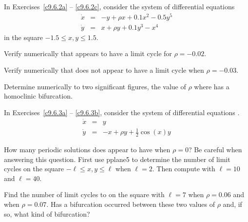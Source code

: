 \documentclass{ximera}
\begin{document}
\noindent In Exercises~\ref{c9.6.2a} -- \ref{c9.6.2c}, consider the system 
of differential equations 
\begin{equation*}  \label{E:homo2}
\begin{array}{rcl}
\dot{x} & = & -y + \rho x + 0.1 x^2 - 0.5 y^5 \\
\dot{y} & = & x +\rho y + 0.1 y^3 - x^4
\end{array}
\end{equation*}
in the square $-1.5\leq x,y\leq 1.5$.
\begin{exercise} \label{c9.6.2a}
Verify numerically that  appears to have a limit cycle for 
$\rho=-0.02$.
\end{exercise} 
\begin{exercise} \label{c9.6.2b}
Verify numerically that  does not appear to have a limit cycle 
when $\rho=-0.03$.
\end{exercise} 
\begin{exercise} \label{c9.6.2c}
Determine numerically to two significant figures, the value of $\rho$
where  has a homoclinic bifurcation. 
\end{exercise} 

\noindent In Exercises~\ref{c9.6.3a} -- \ref{c9.6.3b}, consider the system 
of differential equations .
\begin{equation*}  \label{E:infinity}
\begin{array}{rcl}
\dot{x} & = & y \\
\dot{y} & = & -x +\rho y + \frac{1}{2}\cos(x)y
\end{array}
\end{equation*}
\begin{exercise} \label{c9.6.3a}
How many periodic solutions does  appear to have 
when $\rho=0$?  Be careful when answering this question.  First use 
{\sf pplane5} to determine the number of limit cycles on the square 
$-\ell \leq x,y \leq\ell$ when $\ell=2$.  Then compute with $\ell=10$ and 
$\ell=40$.
\end{exercise}
\begin{exercise} \label{c9.6.3b}
Find the number of limit cycles to  on the square 
with $\ell=7$ when $\rho=0.06$ and when $\rho=0.07$.  Has a bifurcation
 occurred between these two values of $\rho$ and, if so, what kind of 
bifurcation?
\end{exercise}
\end{document}
